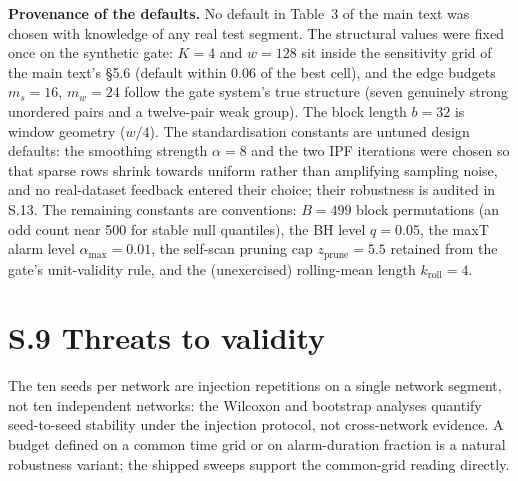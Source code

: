 \documentclass[11pt,a4paper]{article}
\begin{document}
\medskip
\noindent\textbf{Provenance of the defaults.} No default in Table~3 of
the main text was chosen with knowledge of any real test segment. The
structural values were fixed once on the synthetic gate: $K{=}4$ and
$w{=}128$ sit inside the sensitivity grid of the main text's \S5.6
(default within $0.06$ of the best cell), and the edge budgets
$m_s{=}16$, $m_w{=}24$ follow the gate system's true structure (seven
genuinely strong unordered pairs and a twelve-pair weak group). The
block length $b{=}32$ is window geometry ($w/4$). The standardisation
constants are untuned design defaults: the smoothing strength
$\alpha{=}8$ and the two IPF iterations were chosen so that sparse rows
shrink towards uniform rather than amplifying sampling noise, and no
real-dataset feedback entered their choice; their robustness is audited
in S.13. The remaining constants are conventions: $B{=}499$ block
permutations (an odd count near 500 for stable null quantiles), the
BH level $q{=}0.05$, the maxT alarm level $\alpha_{\max}{=}0.01$, the
self-scan pruning cap $z_{\mathrm{prune}}{=}5.5$ retained from the gate's
unit-validity rule, and the (unexercised) rolling-mean length
$k_{\mathrm{roll}}{=}4$.

\section*{S.9 Threats to validity}

The ten seeds per network are injection repetitions on a single network
segment, not ten independent networks: the Wilcoxon and bootstrap analyses
quantify seed-to-seed stability under the injection protocol, not
cross-network evidence. A budget defined on a common time grid or on
alarm-duration fraction is a natural robustness variant; the shipped
sweeps support the common-grid reading directly.
\end{document}
